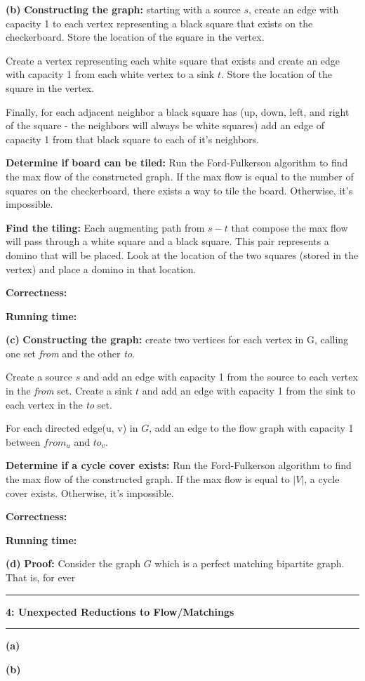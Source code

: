 \documentclass[11pt]{article}
\newcommand\question[2]{\vspace{.25in}\hrule\textbf{#1: #2}\vspace{.5em}\hrule\vspace{.10in}}
\renewcommand\part[1]{\vspace{.10in}\textbf{(#1)}}
\newcommand\correctness{\vspace{.10in}\textbf{Correctness: }}
\newcommand\runtime{\vspace{.10in}\textbf{Running time: }}
\begin{document}
\part{b} \textbf{Constructing the graph:} starting with a source $s$, create an edge with capacity 1 to each vertex representing a black square that exists on the checkerboard. Store the location of the square in the vertex.

Create a vertex representing each white square that exists and create an edge with capacity 1 from each white vertex to a sink $t$. Store the location of the square in the vertex.

Finally, for each adjacent neighbor a black square has (up, down, left, and right of the square - the neighbors will always be white squares) add an edge of capacity 1 from that black square to each of it's neighbors.

\textbf{Determine if board can be tiled:} Run the Ford-Fulkerson algorithm to find the max flow of the constructed graph. If the max flow is equal to the number of squares on the checkerboard, there exists a way to tile the board. Otherwise, it's impossible.

\textbf{Find the tiling:} Each augmenting path from $s-t$ that compose the max flow will pass through a white square and a black square. This pair represents a domino that will be placed. Look at the location of the two squares (stored in the vertex) and place a domino in that location.

\correctness

\runtime

\part{c} \textbf{Constructing the graph:} create two vertices for each vertex in G, calling one set \textit{from} and the other \textit{to}.

Create a source $s$ and add an edge with capacity 1 from the source to each vertex in the \textit{from} set. Create a sink $t$ and add an edge with capacity 1 from the sink to each vertex in the \textit{to} set.

For each directed edge(u, v) in $G$, add an edge to the flow graph with capacity 1 between $from_u$ and $to_v$.

\textbf{Determine if a cycle cover exists:} Run the Ford-Fulkerson algorithm to find the max flow of the constructed graph. If the max flow is equal to $|V|$, a cycle cover exists. Otherwise, it's impossible.

\correctness

\runtime 

\part{d} \textbf{Proof:} Consider the graph $G$ which is a perfect matching bipartite graph. That is, for ever

\question{4}{Unexpected Reductions to Flow/Matchings}

\part{a}

\part{b}
\end{document}
